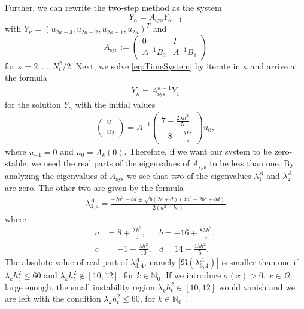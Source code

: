 \documentclass[a4paper,11pt]{article}
\newcommand{\N}{\mathbb N}
\begin{document}
Further, we can rewrite the two-step method as the system
\begin{equation}\label{eq:TimeSystem}
	Y_\kappa = A_{\text{sys}} Y_{\kappa-1}
\end{equation}
with $Y_\kappa =(u_{2\kappa-3},u_{2\kappa-2},u_{2\kappa-1}, u_{2\kappa})^T$ and 
\begin{equation*}
	A_{\text{sys}} := \begin{pmatrix}
		0&I\\A^{-1}B_2&A^{-1} B_1
	\end{pmatrix}
\end{equation*}
for $\kappa=2,\dots, N_t^2/2$. Next, we solve \eqref{eq:TimeSystem} by iterate in $\kappa$ and arrive at the formula
\begin{align*}
	Y_\kappa = A_{\text{sys}}^{\kappa-1}Y_{1}
\end{align*}
for the solution $Y_\kappa$ with the initial values 
\begin{align*}
	\begin{pmatrix}
		u_1\\u_2
	\end{pmatrix}
	= A^{-1}\begin{pmatrix}
		7-\frac{2\lambda h^2}{5}\\
		-{8}-\frac{\lambda h^2}{5}
	\end{pmatrix}
	u_0,
\end{align*}
where $u_{-1} = 0$ and $u_0= \tilde{A}_k(0)$. Therefore, if we want our system to be zero-stable, we need the real parts of the eigenvalues of $A_{\text{sys}}$  to be less than one. By analyzing the eigenvalues of $A_{\text{sys}}$ we see that two of the eigenvalues $\lambda^A_1$ and $\lambda^A_2$ are zero. The other two are given by the formula
\begin{align*}
	\lambda^A_{3,4} = \frac{-2a^2-bd\pm\sqrt{b(2c+d)(4a^2-2bc+bd)}}{2(a^2-bc)}
\end{align*} 
where
\begin{align*}
	a &= {8}+\frac{\lambda h^2}{5}, &b ={-16}+\frac{8\lambda h^2}{5},\\
	c &=-{1}-\frac{\lambda h^2}{10}, &d= {14}-\frac{4\lambda h^2}{5}.
\end{align*}
The absolute value of real part of $\lambda^A_{3,4}$, namely $|\Re(\lambda^A_{3,4})| $ is smaller than one if $\lambda_k h_t^2\leq 60$ and $\lambda_k h_t^2\notin[10,12]$, for $k\in \N_0$. If we introduce $\sigma(x) >0$, $x\in \Omega$, large enough, the small instability region  $\lambda_k h_t^2\in [10,12]$ would vanish and we are left with the condition  $\lambda_k h_t^2\leq 60$, for $k\in\N_0$ .
\end{document}
